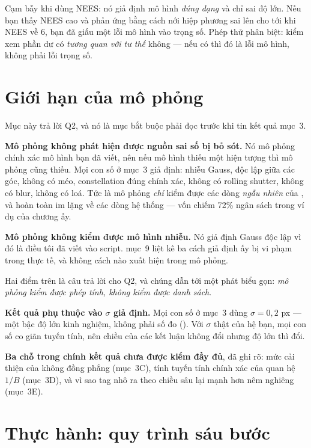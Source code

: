 \documentclass[../../marker.tex]{subfiles}
\begin{document}
Cạm bẫy khi dùng NEES: nó giả định mô hình \emph{đúng dạng} và chỉ sai độ lớn. Nếu bạn thấy NEES cao và phản ứng bằng cách nới hiệp phương sai lên cho tới khi NEES về 6, bạn đã giấu một lỗi mô hình vào trọng số. Phép thử phân biệt: kiểm xem phần dư có \emph{tương quan với tư thế} không --- nếu có thì đó là lỗi mô hình, không phải lỗi trọng số.

\section{Giới hạn của mô phỏng}

Mục này trả lời Q2, và nó là mục bắt buộc phải đọc trước khi tin kết quả mục~3.

\textbf{Mô phỏng không phát hiện được nguồn sai số bị bỏ sót.} Nó mô phỏng chính xác mô hình bạn đã viết, nên nếu mô hình thiếu một hiện tượng thì mô phỏng cũng thiếu. Mọi con số ở mục~3 giả định: nhiễu Gauss, độc lập giữa các góc, không có méo, constellation đúng chính xác, không có rolling shutter, không có blur, không có loá. Tức là mô phỏng \emph{chỉ} kiểm được các dòng \emph{ngẫu nhiên} của , và hoàn toàn im lặng về các dòng hệ thống --- vốn chiếm 72\% ngân sách trong ví dụ của chương ấy.

\textbf{Mô phỏng không kiểm được mô hình nhiễu.} Nó giả định Gauss độc lập vì đó là điều tôi đã viết vào script.  mục~9 liệt kê ba cách giả định ấy bị vi phạm trong thực tế, và không cách nào xuất hiện trong mô phỏng.

Hai điểm trên là câu trả lời cho Q2, và chúng dẫn tới một phát biểu gọn: \emph{mô phỏng kiểm được phép tính, không kiểm được danh sách}.

\textbf{Kết quả phụ thuộc vào \(\sigma\) giả định.} Mọi con số ở mục~3 dùng \(\sigma = 0{,}2\) px --- một bậc độ lớn kinh nghiệm, không phải số đo (). Với \(\sigma\) thật của hệ bạn, mọi con số co giãn tuyến tính, nên chiều của các kết luận không đổi nhưng độ lớn thì đổi.

\textbf{Ba chỗ trong chính kết quả chưa được kiểm đầy đủ}, đã ghi rõ: mức cải thiện của không đồng phẳng (mục~3C), tính tuyến tính chính xác của quan hệ \(1/B\) (mục~3D), và vì sao tag nhô ra theo chiều sâu lại mạnh hơn nêm nghiêng (mục~3E).

\section{Thực hành: quy trình sáu bước}
\end{document}
